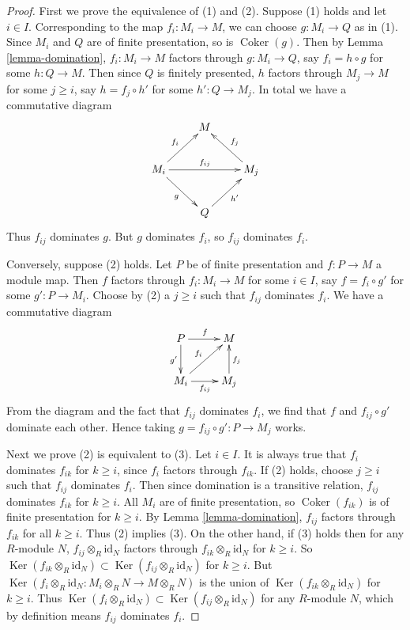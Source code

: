 \documentclass{amsart}
\theoremstyle{plain}
\theoremstyle{definition}
\theoremstyle{remark}
\numberwithin{equation}{subsection}
\def\Ker{\mathop{\mathrm{Ker}}}
\def\Coker{\mathop{\mathrm{Coker}}}
\begin{document}
\begin{proof}
First we prove the equivalence of (1) and (2).  Suppose (1) holds and let $i
\in I$. Corresponding to the map $f_i: M_i \to M$, we can choose $g:
M_i \to Q$ as in (1).  Since $M_i$ and $Q$ are of finite presentation,
so is $\Coker(g)$.  Then by Lemma \ref{lemma-domination}, $f_i : M_i
\to M$ factors through $g: M_i \to Q$, say $f_i = h \circ g$
for some $h: Q \to M$.  Then since $Q$ is finitely presented, $h$
factors through $M_j \to M$ for some $j \geq i$, say $h = f_j \circ h'$
for some $h': Q \to M_j$.  In total we have a commutative diagram
$$
\xymatrix{
  &  M  & \\
M_i \ar[dr]_g \ar[ur]^{f_i} \ar[rr]^{f_{ij}} &
& M_j \ar[ul]_{f_j} \\
  & Q  \ar[ur]_{h'} &
}
$$
Thus $f_{ij}$ dominates $g$.  But $g$ dominates $f_i$, so $f_{ij}$ dominates
$f_i$.

\medskip\noindent
Conversely, suppose (2) holds.  Let $P$ be of finite presentation and $f: P
\to M$ a module map.  Then $f$ factors through $f_i: M_i \to M$
for some $i \in I$, say $f = f_i \circ g'$ for some $g': P \to M_i$.
Choose by (2) a $j \geq i$ such that $f_{ij}$ dominates $f_i$.  We have a
commutative diagram
$$
\xymatrix{
P \ar[d]_{g'} \ar[r]^{f}           & M  \\
M_i \ar[ur]^{f_i} \ar[r]_{f_{ij}} & M_j \ar[u]_{f_j}
}
$$
From the diagram and the fact that $f_{ij}$ dominates $f_i$, we find that $f$
and $f_{ij} \circ g'$ dominate each other.  Hence taking $g = f_{ij} \circ g' :
P \to M_j$ works.

\medskip\noindent
Next we prove (2) is equivalent to (3).  Let $i \in I$.  It is always true that
$f_i$ dominates $f_{ik}$ for $k \geq i$, since $f_i$ factors through
$f_{ik}$.  If (2) holds, choose $j \geq i$ such that $f_{ij}$ dominates
$f_i$.  Then since domination is a transitive relation, $f_{ij}$ dominates
$f_{ik}$ for $k \geq i$. All $M_i$ are of finite presentation, so
$\Coker(f_{ik})$ is of finite presentation for $k \geq i$.  By Lemma
\ref{lemma-domination}, $f_{ij}$ factors through $f_{ik}$ for all $k \geq i$.
Thus (2) implies (3).  On the other hand, if (3) holds then for any $R$-module
$N$, $f_{ij} \otimes_R \text{id}_N$ factors through $f_{ik}
\otimes_R \text{id}_N$ for $k \geq i$.  So $\Ker(f_{ik} \otimes_R
\text{id}_N) \subset \Ker(f_{ij} \otimes_R \text{id}_N)$ for $k
\geq i$.  But $\Ker(f_i \otimes_R \text{id}_N: M_i \otimes_R N
\to M \otimes_R N)$ is the union of $\Ker(f_{ik} \otimes_R
\text{id}_N)$ for $k \geq i$.  Thus $\Ker(f_i \otimes_R
\text{id}_N) \subset \Ker(f_{ij} \otimes_R \text{id}_N)$ for
any $R$-module $N$, which by definition means $f_{ij}$ dominates $f_i$.


\end{proof}
\end{document}
